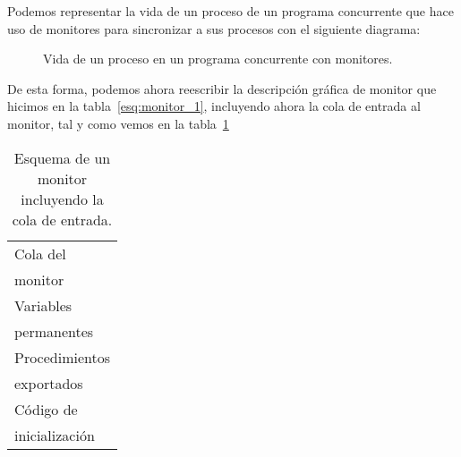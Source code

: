 Podemos representar la vida de un proceso de un programa concurrente que hace uso de monitores para sincronizar a sus procesos con el siguiente diagrama:
\begin{figure}[H]
\centering
{}
\caption{Vida de un proceso en un programa concurrente con monitores.}
\end{figure}

De esta forma, podemos ahora reescribir la descripción gráfica de monitor que hicimos en la tabla~\ref{esq:monitor_1}, incluyendo ahora la cola de entrada al monitor, tal y como vemos en la tabla~\ref{esq:monitor_2}
\begin{table}[H]
\centering
\begin{tabular}{|l|}
\hline
Cola del\\
monitor \\
\hline
Variables \\
permanentes \\
\hline
Procedimientos \\
exportados \\
\hline
Código de \\ 
inicialización \\
\hline
\end{tabular}
\caption{Esquema de un monitor incluyendo la cola de entrada.}
\label{esq:monitor_2}
\end{table}

